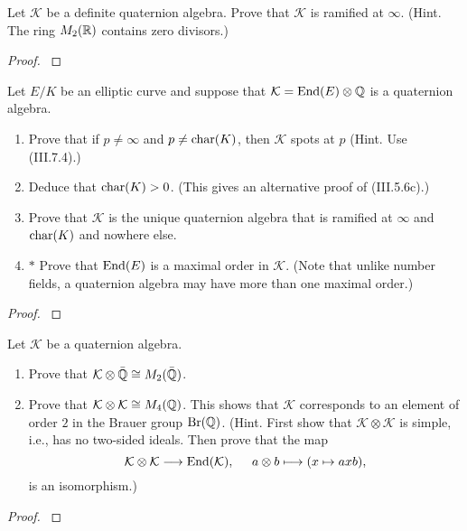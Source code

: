 \documentclass[12pt,reqno]{amsart}
\begin{document}
\begin{exe}\label{3.17}
Let $\mathcal{K}$ be a definite quaternion algebra.  Prove that $\mathcal{K}$ is ramified at $\infty$.  (Hint.  The ring $M_2({\mathbb R})$ contains zero divisors.)
\begin{proof}\label{s3.17}

\end{proof} 
\end{exe} 

\begin{exe}\label{3.18}
Let $E/K$ be an elliptic curve and suppose that $\mathcal{K}={\operatorname{End}}(E) \otimes {\mathbb Q}$ is a quaternion algebra.
\begin{enumerate}
\item
Prove that if $p \neq \infty$ and $p \neq {\operatorname{char}}(K)$,  then $\mathcal{K}$ spots at $p$ (Hint.  Use (III.7.4).)
\item
Deduce that ${\operatorname{char}}(K)>0$.  (This gives an alternative proof of (III.5.6c).)
\item
Prove that $\mathcal{K}$ is the unique quaternion algebra that is ramified at $\infty$ and ${\operatorname{char}}(K)$ and nowhere else.
\item
$\ast$ Prove that ${\operatorname{End}}(E)$ is a maximal order in $\mathcal{K}$.  (Note that unlike number fields, a quaternion algebra may have more than one maximal order.)
\end{enumerate}
\begin{proof}\label{s3.18}

\end{proof} 
\end{exe} 

\begin{exe}\label{3.19}
Let $\mathcal{K}$ be a quaternion algebra.
\begin{enumerate}
\item
Prove that $\mathcal{K}\otimes \bar{{\mathbb Q}}\cong M_2(\bar{{\mathbb Q}})$.

\item
Prove that $\mathcal{K}\otimes \mathcal{K} \cong M_4({\mathbb Q})$.  This shows that $\mathcal{K}$ corresponds to an element of order $2$ in the Brauer group ${\operatorname{Br}}({\mathbb Q})$.  (Hint. First show that $\mathcal{K}\otimes \mathcal{K}$ is simple, i.e., has no two-sided ideals.  Then prove that the map
\[
\mathcal{K}\otimes \mathcal{K}\longrightarrow {\operatorname{End}}(\mathcal{K}),\;\;\;\;\;a\otimes b \longmapsto (x \mapsto axb),
\]
is an isomorphism.)
\end{enumerate}
\begin{proof}\label{s3.19}

\end{proof} 
\end{exe} 
\end{document}
